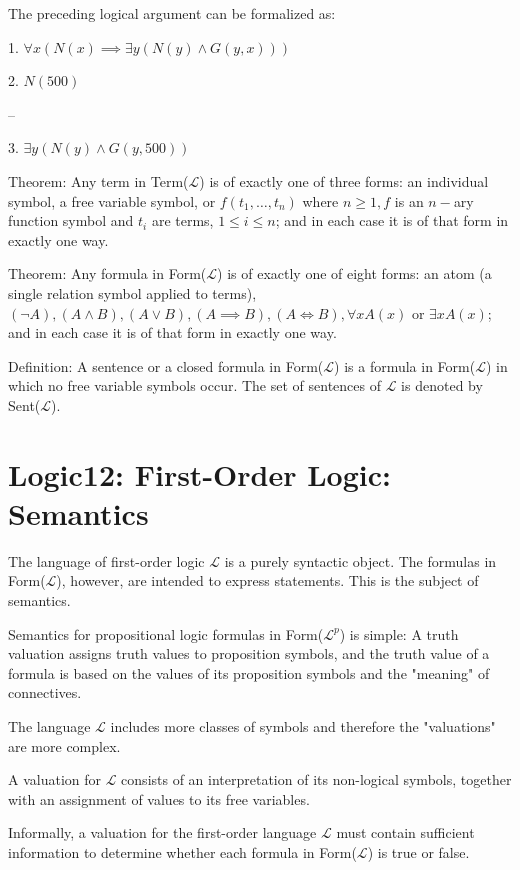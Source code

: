 \documentclass{article}
\begin{document}
The preceding logical argument can be formalized as:

1. $\forall x (N(x) \implies \exists y(N(y) \wedge G(y,x)))$

2. $N(500)$

--

3. $\exists y (N(y) \wedge G(y,500))$

Theorem: Any term in Term($\mathcal{L}$) is of exactly one of three forms: an individual symbol, a free variable symbol, or $f(t_1, \ldots, t_n)$ where $n \ge 1, f$ is an $n-$ary function symbol and $t_i$ are terms, $1 \le i \le n$; and in each case it is of that form in exactly one way.

Theorem: Any formula in Form($\mathcal{L}$) is of exactly one of eight forms: an atom (a single relation symbol applied to terms), $(\neg A), (A \wedge B), (A \vee B), (A \implies B), (A \iff B), \forall x A(x)$ or $\exists x A(x)$; and in each case it is of that form in exactly one way.

Definition: A sentence or a closed formula in Form($\mathcal{L}$) is a formula in Form($\mathcal{L}$) in which no free variable symbols occur. The set of sentences of $\mathcal{L}$ is denoted by Sent($\mathcal{L}$). 


\section{Logic12: First-Order Logic: Semantics}

The language of first-order logic $\mathcal{L}$ is a purely syntactic object. The formulas in Form($\mathcal{L}$), however, are intended to express statements. This is the subject of semantics.

Semantics for propositional logic formulas in Form($\mathcal{L}^p$) is simple: A truth valuation assigns truth values to proposition symbols, and the truth value of a formula is based on the values of its proposition symbols and the "meaning" of connectives.

The language $\mathcal{L}$ includes more classes of symbols and therefore the "valuations" are more complex.

A valuation for $\mathcal{L}$ consists of an interpretation of its non-logical symbols, together with an assignment of values to its free variables.

Informally, a valuation for the first-order language $\mathcal{L}$ must contain sufficient information to determine whether each formula in Form($\mathcal{L}$) is true or false.
\end{document}
